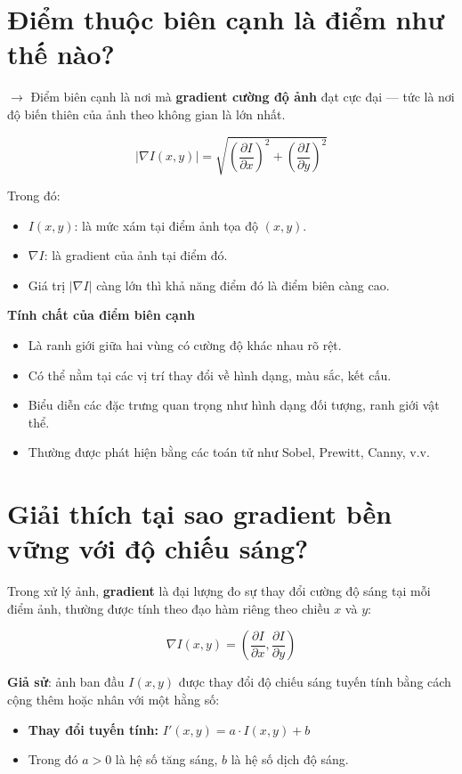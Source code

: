 \documentclass[12pt]{article}
\begin{document}
	\section{Điểm thuộc biên cạnh là điểm như thế nào?}
	
	$\rightarrow$ Điểm biên cạnh là nơi mà \textbf{gradient cường độ ảnh} đạt cực đại — tức là nơi độ biến thiên của ảnh theo không gian là lớn nhất.
	
	\[
	|\nabla I(x, y)| = \sqrt{ \left( \frac{\partial I}{\partial x} \right)^2 + \left( \frac{\partial I}{\partial y} \right)^2 }
	\]
	
	Trong đó:
	\begin{itemize}
	\item $I(x, y)$: là mức xám tại điểm ảnh tọa độ $(x, y)$.
	\item $\nabla I$: là gradient của ảnh tại điểm đó.
	\item Giá trị $|\nabla I|$ càng lớn thì khả năng điểm đó là điểm biên càng cao.
	\end{itemize}
	
	\textbf{Tính chất của điểm biên cạnh}
	
	\begin{itemize}
	\item Là ranh giới giữa hai vùng có cường độ khác nhau rõ rệt.
	\item Có thể nằm tại các vị trí thay đổi về hình dạng, màu sắc, kết cấu.
	\item Biểu diễn các đặc trưng quan trọng như hình dạng đối tượng, ranh giới vật thể.
	\item Thường được phát hiện bằng các toán tử như Sobel, Prewitt, Canny, v.v.
	\end{itemize}
	
	\section{Giải thích tại sao gradient bền vững với độ chiếu sáng?}
	
	Trong xử lý ảnh, \textbf{gradient} là đại lượng đo sự thay đổi cường độ sáng tại mỗi điểm ảnh, thường được tính theo đạo hàm riêng theo chiều $x$ và $y$:
	
	\[
	\nabla I(x, y) = \left( \frac{\partial I}{\partial x}, \frac{\partial I}{\partial y} \right)
	\]
	
	\textbf{Giả sử}: ảnh ban đầu $I(x, y)$ được thay đổi độ chiếu sáng tuyến tính bằng cách cộng thêm hoặc nhân với một hằng số:
	
	\begin{itemize}
	\item \textbf{Thay đổi tuyến tính:} $I'(x, y) = a \cdot I(x, y) + b$
	\item Trong đó $a > 0$ là hệ số tăng sáng, $b$ là hệ số dịch độ sáng.
	\end{itemize}
	
\end{document}

